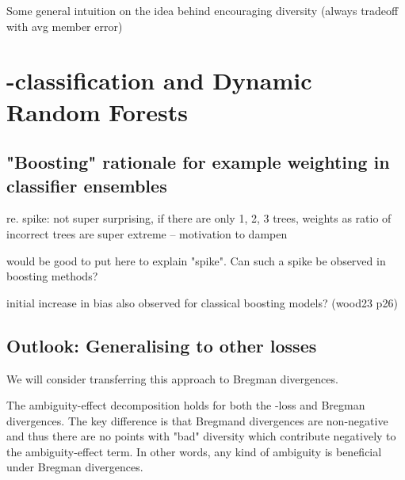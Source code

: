 \documentclass[
    a4paper, %
	fontsize=10pt, %
	twoside=false, %
]{kaobook}
\begin{document}
\begin{titlepage}
Some general intuition on the idea behind encouraging diversity (always tradeoff with avg member error)


\section{\zeroone-classification and Dynamic Random Forests}
\label{sec:dynamic-random-forests}


\subsection{"Boosting" rationale for example weighting in classifier ensembles}

re. spike: not super surprising, if there are only 1, 2, 3 trees, weights as ratio of incorrect trees are super extreme -- motivation to dampen

would be good to put here to explain "spike". Can such a spike be observed in boosting methods?

initial increase in bias also observed for classical boosting models? (wood23 p26)



\subsection{Outlook: Generalising to other losses}


We will consider transferring this approach to Bregman divergences.

The ambiguity-effect decomposition holds for both the \zeroone-loss and Bregman divergences. The key difference is that Bregmand divergences are non-negative and thus there are no points with "bad" diversity which contribute negatively to the ambiguity-effect term. In other words, any kind of ambiguity is beneficial under Bregman divergences.


\end{titlepage}
\end{document}
